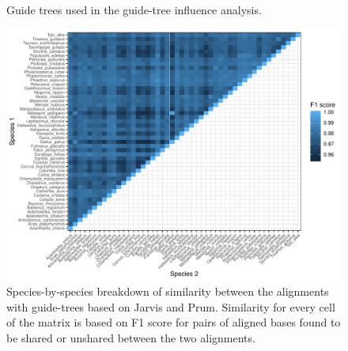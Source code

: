 \documentclass{article}
\begin{document}
\begin{figure}
\begin{center}
\caption[Guide trees used in the guide-tree influence analysis]{Guide trees used in the guide-tree influence analysis.}\label{fig:guideTreeTrees}
\end{center}
\end{figure}

\begin{figure}
\begin{center}
\includegraphics[width=\textwidth]{jarvis_prum_compare_matrix}
\caption{Species-by-species breakdown of similarity between the alignments with guide-trees based on Jarvis and Prum. Similarity for every cell of the matrix is based on F1 score for pairs of aligned bases found to be shared or unshared between the two alignments.}\label{fig:jarvisPrumCompareMatrix}
\end{center}
\end{figure}
\end{document}
